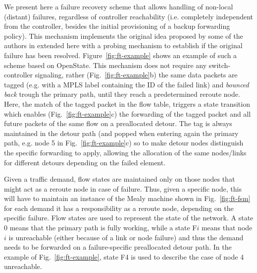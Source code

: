 \documentclass[10pt,conference]{IEEEtran}
\begin{document}
We present here a failure recovery scheme that allows handling of non-local (distant) failures, regardless of controller reachability (i.e. completely independent from the controller, besides the initial provisioning of a backup forwarding policy). This mechanism implements the original idea proposed by some of the authors in \cite{Cap15} extended here with a probing mechanism to establish if the original failure has been resolved. Figure~\ref{fig:ft-example} shows an example of such a scheme based on OpenState. This mechanism does not require any switch-controller signaling, rather (Fig.~\ref{fig:ft-example}b) the same data packets are tagged (e.g. with a MPLS label containing the ID of the failed link) and \emph{bounced back} trough the primary path, until they reach a predetermined reroute node. Here, the match of the tagged packet in the flow table, triggers a state transition which enables (Fig.~\ref{fig:ft-example}c) the forwarding of the tagged packet and all future packets of the same flow on a preallocated detour. The tag is always maintained in the detour path (and popped when entering again the primary path, e.g. node 5 in Fig.~\ref{fig:ft-example}c) so to make detour nodes distinguish the specific forwarding to apply, allowing the allocation of the same nodes/links for different detours depending on the failed element.

Given a traffic demand, flow states are maintained only on those nodes that might act as a reroute node in case of failure. Thus, given a specific node, this will have to maintain an instance of the Mealy machine shown in Fig.~\ref{fig:ft-fsm} for each demand it has a responsibility as a reroute node, depending on the specific failure. Flow states are used to represent the state of the network. A state 0 means that the primary path is fully working, while a state F$i$ means that node $i$ is unreachable (either because of a link or node failure) and thus the demand needs to be forwarded on a failure-specific preallocated detour path. In the example of Fig.~\ref{fig:ft-example}, state F4 is used to describe the case of node 4 unreachable.
\end{document}
